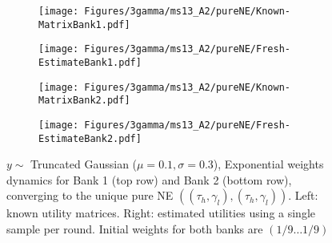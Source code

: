 \begin{figure}[H]
    \centering
    \begin{subfigure}{0.49\linewidth}
        \centering
        \texttt{[image: Figures/3gamma/ms13\_A2/pureNE/Known-MatrixBank1.pdf]}
    \end{subfigure}
    \begin{subfigure}{0.49\linewidth}
        \centering
        \texttt{[image: Figures/3gamma/ms13\_A2/pureNE/Fresh-EstimateBank1.pdf]}
    \end{subfigure}

    \begin{subfigure}{0.49\linewidth}
        \centering
        \texttt{[image: Figures/3gamma/ms13\_A2/pureNE/Known-MatrixBank2.pdf]}
    \end{subfigure}
    \begin{subfigure}{0.49\linewidth}
        \centering
        \texttt{[image: Figures/3gamma/ms13\_A2/pureNE/Fresh-EstimateBank2.pdf]}
    \end{subfigure}
    \caption{$y \sim$ Truncated Gaussian ($\mu=0.1, \sigma=0.3$), Exponential weights dynamics for Bank 1 (top row) and Bank 2 (bottom row), converging to the unique pure NE $((\tau_h, \gamma_l),(\tau_h, \gamma_l))$. Left: known utility matrices. Right: estimated utilities using a single sample per round. Initial weights for both banks are $(1/9 \ldots 1/9)$ \label{fig:dyna-A2-pure}}

\end{figure}


